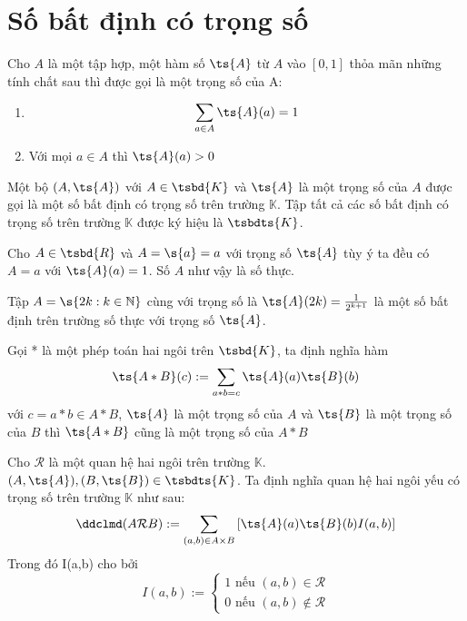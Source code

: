 \section{Số bất định có trọng số}
\begin{definition}[Trọng số]
	Cho $A$ là một tập hợp, một hàm số $\ts{A}$ từ $A$ vào $[0,1]$ thỏa mãn những tính chất sau thì được gọi là một trọng số của A: 
	\begin{enumerate}
		\item $$\sum_{a \in A}{\ts{A}(a) } = 1$$
		\item Với mọi $a \in A$ thì $\ts{A}(a) > 0 $
	\end{enumerate}
\end{definition}
\begin{definition}
	Một bộ $(A,\ts{A})$ với $A \in \tsbd{K}$ và $\ts{A}$ là một trọng số của $A$ được gọi là một số bất định có trọng số trên trường $\mathbb{K}$. Tập tất cả các số bất định có trọng số trên trường $\mathbb{K}$ được ký hiệu là $\tsbdts{K}$.
\end{definition}
\begin{example}
	Cho $A \in \tsbd{R}$ và $A = \s{a} = a  $ với trọng số $\ts{A}$ tùy ý ta đều có $A = a$ với $\ts{A}(a) =1$. Số $A$ như vậy là số thực.
\end{example}
\begin{example}
	Tập $A=\s{2k : k \in \mathbb{N}}$ cùng với trọng số là $\ts{A}(2k) = \frac{1}{2^{k+1}}$ là một số bất định trên trường số thực với trọng số  $\ts{A}$.
\end{example}
\begin{theorem}
	Gọi * là một phép toán hai ngôi trên $\tsbd{K}$, ta định nghĩa hàm $$\ts{A*B}(c) := \sum_{a*b=c}{\ts{A}(a)\ts{B}(b)}$$ với $c = a  * b \in A * B $, $\ts{A}$ là một trọng số của $A$ và $\ts{B}$ là một trọng số của $B$ thì $\ts{A*B}$ cũng là một trọng số của $A *B $
\end{theorem}
\begin{definition}
	Cho $\mathcal{R}$ là một quan hệ hai ngôi trên trường $\mathbb{K}$. $(A,\ts{A}),(B,\ts{B}) \in \tsbdts{K}$. Ta định nghĩa quan hệ hai ngôi yếu có trọng số trên trường $\mathbb{K}$ như sau:
	\[\ddclmd(A\mathcal{R}B) := \sum_{(a,b) \in A \times B}{\left[\ts{A}(a)\ts{B}(b)I(a,b)\right]}\]
	Trong đó I(a,b) cho bởi \[
	I(a,b) := \begin{cases}
		1 \text{ nếu } (a,b) \in \mathcal{R} \\
		0 \text{ nếu } (a,b) \notin \mathcal{R}
	\end{cases}
	\]
\end{definition}